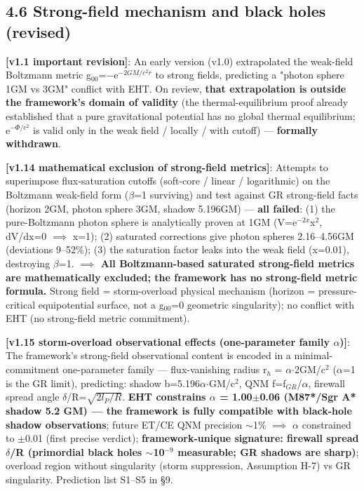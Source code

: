 \documentclass[12pt]{article}
\newcommand{\mtag}[1]{\textbf{[#1]}}
\newcommand{\up}[1]{\ensuremath{^{#1}}}
\newcommand{\down}[1]{\ensuremath{_{#1}}}
\begin{document}
\subsection{4.6 Strong-field mechanism and black holes (revised)}

\textbf{\mtag{v1.1 important revision}}: An early version (v1.0) extrapolated the weak-field Boltzmann metric g\down{00}=\ensuremath{-}e\up{-2GM/c^{2}r} to strong fields, predicting a "photon sphere 1GM vs 3GM" conflict with EHT. On review, \textbf{that extrapolation is outside the framework's domain of validity} (the thermal-equilibrium proof already established that a pure gravitational potential has no global thermal equilibrium; e\up{-\Phi{}/c^{2}} is valid only in the weak field / locally / with cutoff) --- \textbf{formally withdrawn}.

\textbf{\mtag{v1.14 mathematical exclusion of strong-field metrics}}: Attempts to superimpose flux-saturation cutoffs (soft-core / linear / logarithmic) on the Boltzmann weak-field form (\ensuremath{\beta}=1 surviving) and test against GR strong-field facts (horizon 2GM, photon sphere 3GM, shadow 5.196GM) --- \textbf{all failed}: (1) the pure-Boltzmann photon sphere is analytically proven at 1GM (V=e\up{-2x}x\up{2}, dV/dx=0 \ensuremath{\implies} x=1); (2) saturated corrections give photon spheres 2.16--4.56GM (deviations 9--52\%); (3) the saturation factor leaks into the weak field (x=0.01), destroying \ensuremath{\beta}=1. \textbf{\ensuremath{\implies} All Boltzmann-based saturated strong-field metrics are mathematically excluded; the framework has no strong-field metric formula.} Strong field = storm-overload physical mechanism (horizon = pressure-critical equipotential surface, not a g\down{00}=0 geometric singularity); no conflict with EHT (no strong-field metric commitment).

\textbf{\mtag{v1.15 storm-overload observational effects (one-parameter family \ensuremath{\alpha})}}: The framework's strong-field observational content is encoded in a minimal-commitment one-parameter family --- flux-vanishing radius r\down{h} = \ensuremath{\alpha}\ensuremath{\cdot}2GM/c\up{2} (\ensuremath{\alpha}=1 is the GR limit), predicting: shadow b=5.196\ensuremath{\alpha}\ensuremath{\cdot}GM/c\up{2}, QNM f=f\down{GR}/\ensuremath{\alpha}, firewall spread angle \ensuremath{\delta}/R=\ensuremath{\sqrt{2l\down{P}/R}}. \textbf{EHT constrains \ensuremath{\alpha} = 1.00\ensuremath{\pm}0.06 (M87*/Sgr A* shadow 5.2 GM) --- the framework is fully compatible with black-hole shadow observations}; future ET/CE QNM precision \ensuremath{\sim}1\% \ensuremath{\implies} \ensuremath{\alpha} constrained to \ensuremath{\pm}0.01 (first precise verdict); \textbf{framework-unique signature: firewall spread \ensuremath{\delta}/R (primordial black holes \ensuremath{\sim}10\up{-9} measurable; GR shadows are sharp)}; overload region without singularity (storm suppression, Assumption H-7) vs GR singularity. Prediction list S1--S5 in \S{}9.
\end{document}
